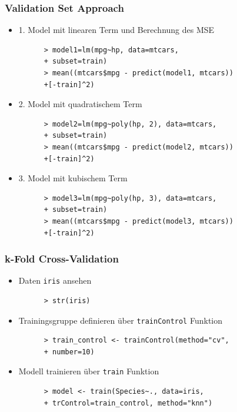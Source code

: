 \documentclass{beamer}
\begin{document}
\begin{frame}[fragile]
  \frametitle{Validation Set Approach}
  \begin{itemize}
    \item 1. Model mit linearen Term und Berechnung des MSE
    \begin{Verbatim}
      > model1=lm(mpg~hp, data=mtcars, 
      + subset=train)
      > mean((mtcars$mpg - predict(model1, mtcars))
      +[-train]^2)
    \end{Verbatim}
        \item 2. Model mit quadratischem Term
    \begin{Verbatim}
      > model2=lm(mpg~poly(hp, 2), data=mtcars, 
      + subset=train)
      > mean((mtcars$mpg - predict(model2, mtcars))
      +[-train]^2)
    \end{Verbatim}
        \item 3. Model mit kubischem Term
    \begin{Verbatim}
      > model3=lm(mpg~poly(hp, 3), data=mtcars, 
      + subset=train)
      > mean((mtcars$mpg - predict(model3, mtcars))
      +[-train]^2)
    \end{Verbatim}
  \end{itemize}
\end{frame}

\begin{frame}[fragile]
  \frametitle{k-Fold Cross-Validation}
  \begin{itemize}
    \item Daten \Verb+iris+ ansehen
    \begin{Verbatim}
      > str(iris)
    \end{Verbatim}
    \item Trainingsgruppe definieren über \Verb+trainControl+ Funktion
    \begin{Verbatim}
      > train_control <- trainControl(method="cv", 
      + number=10)
    \end{Verbatim}
    \item Modell trainieren über \Verb+train+ Funktion
    \begin{Verbatim}
      > model <- train(Species~., data=iris, 
      + trControl=train_control, method="knn")
    \end{Verbatim}
  \end{itemize}
\end{frame}
\end{document}
